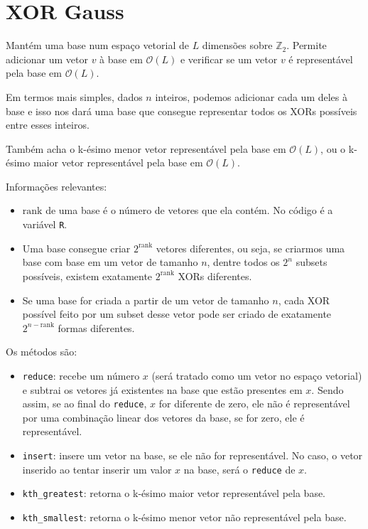 \documentclass[10pt, a4paper, oneside]{book}
\begin{document}
\section{XOR Gauss}


Mantém uma base num espaço vetorial de $L$ dimensões sobre $\mathbb{Z}_2$. Permite adicionar um vetor $v$ à base em $\mathcal{O}(L)$ e verificar se um vetor $v$ é representável pela base em $\mathcal{O}(L)$.



Em termos mais simples, dados $n$ inteiros, podemos adicionar cada um deles à base e isso nos dará uma base que consegue representar todos os XORs possíveis entre esses inteiros.



Também acha o k-ésimo menor vetor representável pela base em $\mathcal{O}(L)$, ou o k-ésimo maior vetor representável pela base em $\mathcal{O}(L)$.



Informações relevantes:



\begin{itemize}
\item $\text{rank}$ de uma base é o número de vetores que ela contém. No código é a variável \texttt{R}.
\item Uma base consegue criar $2^{\text{rank}}$ vetores diferentes, ou seja, se criarmos uma base com base em um vetor de tamanho $n$, dentre todos os $2^n$ subsets possíveis, existem exatamente $2^{\text{rank}}$ XORs diferentes.
\item Se uma base for criada a partir de um vetor de tamanho $n$, cada XOR possível feito por um subset desse vetor pode ser criado de exatamente $2^{n - \text{rank}}$ formas diferentes.
\end{itemize}



Os métodos são:



\begin{itemize}
\item \texttt{reduce}: recebe um número $x$ (será tratado como um vetor no espaço vetorial) e subtrai os vetores já existentes na base que estão presentes em $x$. Sendo assim, se ao final do \texttt{reduce}, $x$ for diferente de zero, ele não é representável por uma combinação linear dos vetores da base, se for zero, ele é representável.
\item \texttt{insert}: insere um vetor na base, se ele não for representável. No caso, o vetor inserido ao tentar inserir um valor $x$ na base, será o \texttt{reduce} de $x$.
\item \texttt{kth\_greatest}: retorna o k-ésimo maior vetor representável pela base.
\item \texttt{kth\_smallest}: retorna o k-ésimo menor vetor não representável pela base.
\end{itemize}
\end{document}
